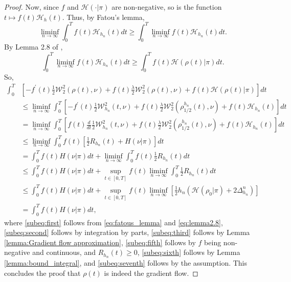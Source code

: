 \documentclass[final,12pt]{colt2018}
\newcommand{\was}{\mathcal{W}}
\begin{document}
\begin{proof}
Now, since $f$ and $\mathcal{H}(\cdot | \pi)$ are non-negative, so is the function $t \mapsto f(t)\mathcal{H}_{h}(t)$. Thus, by Fatou's lemma,
\begin{equation}
\liminf_{n \to \infty} \int_0^T f(t)\mathcal{H}_{h_n}(t) dt \geq \int_0^T \liminf_{n \to \infty} f(t)\mathcal{H}_{h_n}(t)dt. \label{eq:fatous_lemma}
\end{equation}
By Lemma 2.8 of \citet{clement2011trotter}, 
\begin{equation}
\int_0^T \liminf_{n \to \infty} f(t)\mathcal{H}_{h_n}(t) dt \geq \int_0^T f(t)\mathcal{H}(\rho(t) | \pi) dt \label{eq:lemma2.8}.
\end{equation}
So,
\begin{align}
\int_0^T &\left[-f^\prime(t)\frac{1}{2}\was_2^2(\rho(t),\nu) +f(t)\frac{\lambda}{2}\was_2^2(\rho(t),\nu) + f(t)\mathcal{H}(\rho(t) | \pi) \right]dt \\
&\leq\liminf_{n \to \infty} \int_0^T \left[-f^\prime(t)\frac{1}{2}\was_{h_n}^2(t,\nu)+f(t)\frac{\lambda}{2}\was_2^2(\rho_{1/2}^{h_n}(t),\nu)  + f(t)\mathcal{H}_{h_n}(t)  \right]dt  \label{subeq:first}\\
&= \liminf_{n \to \infty} \int_0^T\left[ f(t)\frac{d}{dt}\frac{1}{2}\was_{h_n}^2(t,\nu) + f(t)\frac{\lambda}{2}\was_2^2(\rho_{1/2}^{h_n}(t),\nu)  + f(t)\mathcal{H}_{h_n}(t) \right] dt \label{subeq:second} \\
&\leq \liminf_{n \to \infty} \int_0^T f(t)\left[ \frac{1}{2}R_{h_n}(t) + H(\nu|\pi)\right] dt \label{subeq:third}\\
&= \int_0^T f(t)H(\nu|\pi)dt + \liminf_{n \to \infty} \int_0^T  f(t)\frac{1}{2}R_{h_n}(t)dt \label{subeq:fourth} \\
&\leq \int_0^T f(t)H(\nu|\pi)dt +\sup_{t\in[0,T]}f(t)\liminf_{n \to \infty} \int_0^T \frac{1}{2}R_{h_n}(t)dt \label{subeq:fifth}\\
& \leq \int_0^T f(t)H(\nu|\pi)dt +\sup_{t\in[0,T]}f(t)\liminf_{n \to \infty}\left[\frac{1}{2}h_n(\mathcal{H}(\rho_0 | \pi) + 2\Delta_{h_n}^n)\right] \label{subeq:sixth}\\
& =  \int_0^T f(t)H(\nu|\pi)dt \label{subeq:seventh},
\end{align}
where \eqref{subeq:first} follows from \eqref{eq:fatous_lemma} and \eqref{eq:lemma2.8}, \eqref{subeq:second} follows by integration by parts, \eqref{subeq:third} follows by Lemma \ref{lemma:Gradient flow approximation}, \eqref{subeq:fifth} follows by $f$ being non-negative and continuous, and $R_{h_n}(t) \geq 0$, \eqref{subeq:sixth} follows by Lemma \ref{lemma:bound_integral}, and \eqref{subeq:seventh} follows by the assumption. This concludes the proof that $\rho(t)$ is indeed the gradient flow.


\end{proof}
\end{document}
